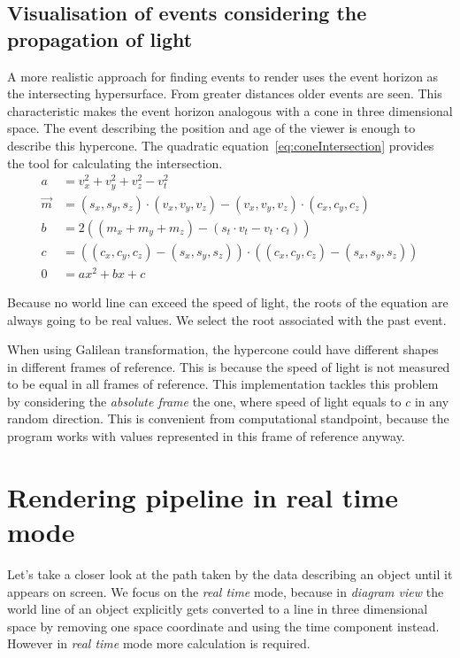 \documentclass{egpubl}
\begin{document}
\subsection{Visualisation of events considering the propagation of light}
\label{visConsLight}
A more realistic approach for finding events to render uses the event horizon as the intersecting hypersurface. From greater distances older events are seen. This characteristic makes the event horizon analogous with a cone in three dimensional space. The  event describing the position and age of the viewer is enough to describe this hypercone. The quadratic equation~\ref{eq:coneIntersection} provides the tool for calculating the intersection.
\begin{align}
a &= v_x^2 + v_y^2 + v_z^2 - v_t^2\\
\vec{m} &= (s_x, s_y, s_z)\cdot{}(v_x, v_y, v_z) - (v_x, v_y, v_z)\cdot{}(c_x, c_y, c_z)\\
b &= 2((m_x + m_y + m_z) - (s_t\cdot{}v_t - v_t\cdot{}c_t))\\
c &= ((c_x, c_y, c_z) - (s_x, s_y, s_z))\cdot{}((c_x, c_y, c_z) - (s_x, s_y, s_z))\\
0 &=ax^2 + bx + c
\label{eq:coneIntersection}
\end{align}

Because no world line can exceed the speed of light, the roots of the equation are always going to be real values. We select the root associated with the past event. 

When using Galilean transformation, the hypercone could have different shapes in different frames of reference. This is because the speed of light is not measured to be equal in all frames of reference. This implementation tackles this problem by considering the \emph{absolute frame} the one, where speed of light equals to $c$ in any random direction. This is convenient from computational standpoint, because the program works with values represented in this frame of reference anyway.

\section{Rendering pipeline in real time mode}
Let's take a closer look at the path taken by the data describing an object until it appears on screen. We focus on the \emph{real time} mode, because in \emph{diagram view} the world line of an object explicitly gets converted to a line in three dimensional space by removing one space coordinate and using the time component instead. However in \emph{real time} mode more calculation is required.
\end{document}
